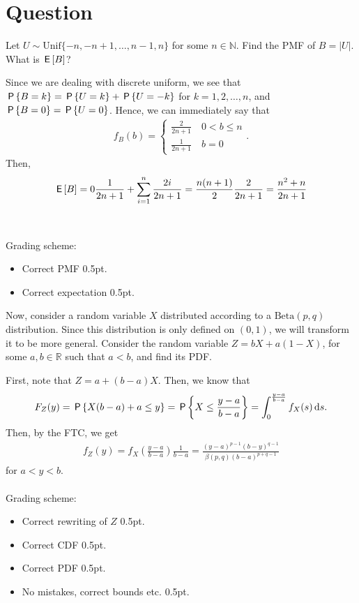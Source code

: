 \section*{Question}
\begin{exercise}[1]
Let $U\sim\text{Unif}\{-n,-n+1,\dots,n-1,n\}$ for some $n\in\mathbb{N}$. Find the PMF of $B = \left|U\right|$. What is $\E{B}$?
\begin{solution}
Since we are dealing with discrete uniform, we see that $\P{B=k}=\P{U=k}+\P{U=-k}$ for $k=1,2,\dots,n$, and $\P{B=0}=\P{U=0}$. Hence, we can immediately say that
\begin{align*}
    f_B(b)=\begin{cases}
    \frac{2}{2n+1}\quad 0<b\leq n\\
    \frac{1}{2n+1}\quad b=0
    \end{cases}.
\end{align*}
Then,
\begin{align*}
    \E{B} = 0\frac{1}{2n+1}+\sum_{i=1}^n{\frac{2i}{2n+1}} = \frac{n(n+1)}{2}\frac{2}{2n+1} = \frac{n^2+n}{2n+1}
\end{align*}
\\\\
Grading scheme:
\begin{itemize}
    \item Correct PMF 0.5pt.
    \item Correct expectation 0.5pt.
\end{itemize}
\end{solution}
\end{exercise}

\begin{exercise}[2]
Now, consider a random variable $X$ distributed according to a $\text{Beta}(p,q)$ distribution. Since this distribution is only defined on $(0,1)$, we will transform it to be more general. Consider the random variable $Z = b X + a (1-X)$, for some $a,b\in\mathbb{R}$ such that $a<b$, and find its PDF.
\begin{solution}
First, note that $Z = a + (b-a)X$. Then, we know that
\begin{align*}
    F_Z(y) = \P{X(b-a)+a\leq y} = \P{X\leq \frac{y-a}{b-a}} = \int_0^{\frac{y-a}{b-a}}{f_X(s)\d s}.
\end{align*}
Then, by the FTC, we get
\begin{align*}
    f_Z(y) = f_X(\frac{y-a}{b-a})\frac{1}{b-a} = \frac{(y-a)^{p-1}(b-y)^{q-1}}{\beta(p,q)(b-a)^{p+q-1}}
\end{align*}
for $a<y<b$.
\\\\
Grading scheme:
\begin{itemize}
    \item Correct rewriting of $Z$ 0.5pt.
    \item Correct CDF 0.5pt.
    \item Correct PDF 0.5pt.
    \item No mistakes, correct bounds etc. 0.5pt.
\end{itemize}
\end{solution}
\end{exercise}

